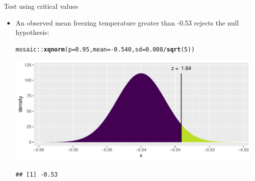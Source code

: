 \documentclass[10pt,handout]{beamer}\usepackage[]{graphicx}\usepackage[]{color}
\makeatletter
\def\maxwidth{ %
  \ifdim\Gin@nat@width>\linewidth
    \linewidth
  \else
    \Gin@nat@width
  \fi
}
\newcommand{\hlnum}[1]{\textcolor[rgb]{0.686,0.059,0.569}{#1}}%
\newcommand{\hlopt}[1]{\textcolor[rgb]{0,0,0}{#1}}%
\newcommand{\hlstd}[1]{\textcolor[rgb]{0.345,0.345,0.345}{#1}}%
\newcommand{\hlkwc}[1]{\textcolor[rgb]{0.333,0.667,0.333}{#1}}%
\newcommand{\hlkwd}[1]{\textcolor[rgb]{0.737,0.353,0.396}{\textbf{#1}}}%
\newenvironment{kframe}{%
 \def\at@end@of@kframe{}%
 \ifinner\ifhmode%
  \def\at@end@of@kframe{\end{minipage}}%
  \begin{minipage}{\columnwidth}%
 \fi\fi%
 \def\FrameCommand##1{\hskip\@totalleftmargin \hskip-\fboxsep
 \colorbox{shadecolor}{##1}\hskip-\fboxsep
     \hskip-\linewidth \hskip-\@totalleftmargin \hskip\columnwidth}%
 \MakeFramed {\advance\hsize-\width
   \@totalleftmargin\z@ \linewidth\hsize
   \@setminipage}}%
 {\par\unskip\endMakeFramed%
 \at@end@of@kframe}
\newenvironment{knitrout}{}{} %
\makeatother
\begin{document}
\begin{frame}[fragile]{Test using critical values}
	\begin{itemize}
		
		\item An observed mean freezing temperature greater than -0.53 rejects the null hypothesis:
		
\begin{knitrout}\tiny
{}\color{fgcolor}\begin{kframe}
\begin{alltt}
\hlstd{mosaic}\hlopt{::}\hlkwd{xqnorm}\hlstd{(}\hlkwc{p} \hlstd{=} \hlnum{0.95}\hlstd{,} \hlkwc{mean} \hlstd{=} \hlopt{-}\hlnum{0.540}\hlstd{,} \hlkwc{sd} \hlstd{=} \hlnum{0.008}\hlopt{/}\hlkwd{sqrt}\hlstd{(}\hlnum{5}\hlstd{))}
\end{alltt}


{\ttfamily\noindent\itshape\color{messagecolor}{\#\# }}

{\ttfamily\noindent\itshape{}}

{\ttfamily\noindent\itshape\color{messagecolor}{\#\# 	P(X <= -0.53) = 0.95}}

{\ttfamily\noindent\itshape\color{messagecolor}{\#\# 	P(X >\ \ -0.53) = 0.05}}

{\ttfamily\noindent\itshape\color{messagecolor}{\#\# }}\end{kframe}

{\centering \includegraphics[width=\maxwidth]{figure/unnamed-chunk-3-1} 

}


\begin{kframe}\begin{verbatim}
## [1] -0.53
\end{verbatim}
\end{kframe}
\end{knitrout}
		
		
	\end{itemize}
\end{frame}
\end{document}
